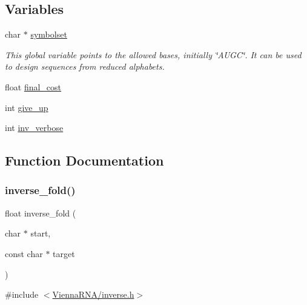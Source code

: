 \subsection*{Variables}
\begin{DoxyCompactItemize}
\item 
\mbox{\label{group__inverse__fold_ga8f791e7740a5a28b9f6fafb4e60301d9}} 
char $\ast$ \hyperlink{group__inverse__fold_ga8f791e7740a5a28b9f6fafb4e60301d9}{symbolset}
\begin{DoxyCompactList}\small\item\em This global variable points to the allowed bases, initially \char`\"{}\+A\+U\+G\+C\char`\"{}. It can be used to design sequences from reduced alphabets. \end{DoxyCompactList}\item 
float \hyperlink{group__inverse__fold_ga7f17d3b169af048d32bb185039a9c09c}{final\+\_\+cost}
\item 
int \hyperlink{group__inverse__fold_ga7ec4ba51f86e1717a1e174264e4a75ce}{give\+\_\+up}
\item 
int \hyperlink{group__inverse__fold_gafcfc65fba01b9cca5946726ed9057a63}{inv\+\_\+verbose}
\end{DoxyCompactItemize}


\subsection{Function Documentation}
\mbox{\label{group__inverse__fold_ga7af026de55d4babad879f2c92559cbbc}} 
\subsubsection{\texorpdfstring{inverse\+\_\+fold()}{inverse\_fold()}}
{\footnotesize\ttfamily float inverse\+\_\+fold (\begin{DoxyParamCaption}\item[{char $\ast$}]{start,  }\item[{const char $\ast$}]{target }\end{DoxyParamCaption})}



{\ttfamily \#include $<$\hyperlink{inverse_8h}{Vienna\+R\+N\+A/inverse.\+h}$>$}



